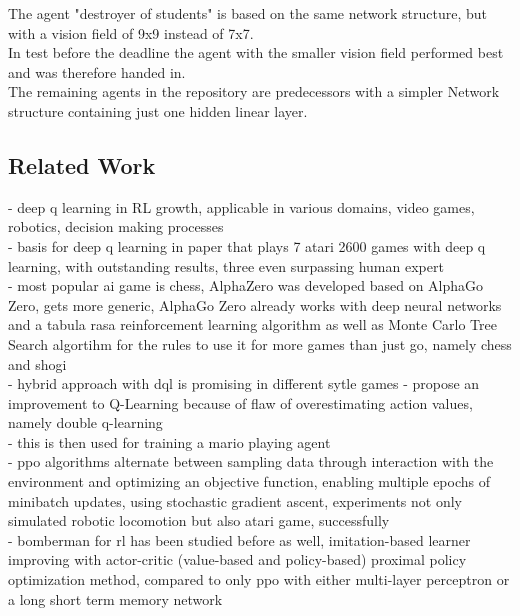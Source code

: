 The agent "destroyer of students" is based on the same network structure, but with a vision field of 9x9 instead of 7x7.\\
In test before the deadline the agent with the smaller vision field performed best and was therefore handed in.\\
The remaining agents in the repository are predecessors with a simpler Network structure containing just one hidden linear layer.

\newpage
{}
\subsection{Related Work}

- deep q learning in RL growth, applicable in various domains, video games, robotics, decision making processes\\
- basis for deep q learning in paper that plays 7 atari 2600 games with deep q learning, with outstanding results, three even surpassing human expert \\%
- most popular ai game is chess, AlphaZero was developed based on AlphaGo Zero, gets more generic, AlphaGo Zero already works with deep neural networks and a tabula rasa reinforcement learning algorithm as well as Monte Carlo Tree Search algortihm for the rules to use it for more games than just go, namely chess and shogi \\%
- hybrid approach with dql is promising in different sytle games
- propose an improvement to Q-Learning because of flaw of overestimating action values, namely double q-learning \\%
- this is then used for training a mario playing agent \\%
- ppo algorithms alternate between sampling data through interaction with the environment and optimizing an objective function, enabling multiple epochs of minibatch updates, using stochastic gradient ascent, experiments not only simulated robotic locomotion but also atari game, successfully\\ %
- bomberman for rl has been studied before as well, imitation-based learner improving with actor-critic (value-based and policy-based) proximal policy optimization method, compared to only ppo with either multi-layer perceptron or a long short term memory network\\%